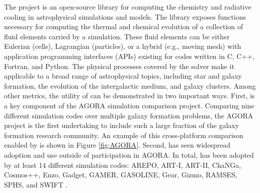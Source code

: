 The \grackle{} project
\citep[][\url{https://grackle.readthedocs.io}]{2017MNRAS.466.2217S} is
an open-source library for computing the chemistry and radiative
cooling in astrophysical simulations and models.  The
\grackle{} library exposes functions necessary for computing the
thermal and chemical evolution of a collection of fluid elements carried by a
simulation.  These fluid elements can be either Eulerian (cells),
Lagrangian (particles), or a hybrid (e.g., moving mesh) with
application programming interfaces (APIs)
existing for codes written in C, C++, Fortran, and Python.  The
physical processes covered by the solver make it applicable to a broad
range of astrophysical topics, including star and galaxy formation, the
evolution of the intergalactic medium, and galaxy clusters.  Among
other metrics, the utility of \grackle{} can be demonstrated in two
important ways.  First, \grackle{} is a key component of the AGORA
\citep{2014ApJS..210...14K, 2016ApJ...833..202K} simulation comparison
project.  Comparing nine different simulation codes over multiple
galaxy formation problems, the AGORA project is the first
undertaking to include such a large fraction of the galaxy formation research
community.  An example of this cross-platform comparison enabled by
\grackle{} is shown in Figure \ref{fig:AGORA}.  Second, \grackle{} has
seen widespread adoption and use outside of participation in AGORA.
In total, \grackle{} has been adopted by at least 14 different
simulation codes:
AREPO, ART-I, ART-II, ChaNGa, Cosmos++, Enzo, Gadget, GAMER, GASOLINE, Gear,
Gizmo, RAMSES, SPHS, and SWIFT
\citep{2010MNRAS.401..791S, 1999PhDT........25K, 2002ApJ...571..563K,
2008ApJ...672...19R, 2004NewA....9..137W, 2006MNRAS.373.1074S,
2003ApJS..147..177A, 2005ApJ...635..723A, 2014ApJS..211...19B,
2005MNRAS.364.1105S, 2010ApJS..186..457S, 2004NewA....9..137W,
2012A&A...538A..82R, 2012ASPC..453..141R, 2015MNRAS.450...53H,
2002A&A...385..337T, 2012MNRAS.422.3037R, 2013arXiv1309.3783G,
2016arXiv160602738S}.

